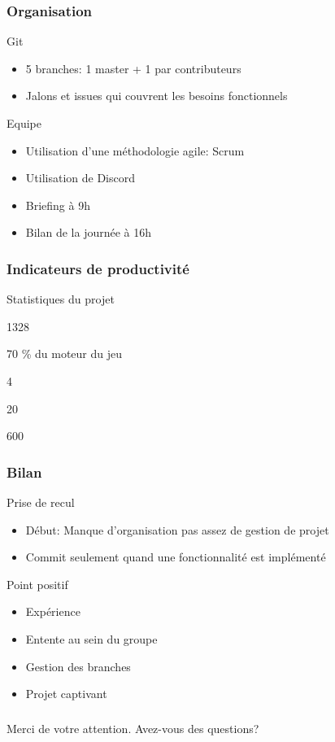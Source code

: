\documentclass[french,t]{beamer}
\begin{document}
	\begin{frame}
		\frametitle{Organisation}
		\begin{block}{Git}
			\begin{itemize}
				\item 5 branches: 1 master + 1 par contributeurs
				\item Jalons et issues qui couvrent les besoins fonctionnels
			\end{itemize}
		\end{block}
	\pause
	\begin{block}{Equipe}
	\begin{itemize}
		\item Utilisation d'une méthodologie agile: Scrum
		\item Utilisation de Discord
		\item Briefing à 9h
		\item Bilan de la journée à 16h
	\end{itemize}
\end{block}
	\end{frame}
	\begin{frame}
		\frametitle{Indicateurs de productivité}
		\begin{block}{Statistiques du projet}
			\begin{description}
				\centering
				\item<1->[Lignes de codes :] 1328
				\item<2->[Tests unitaires (CICD) :] 70 \% du moteur du jeu
				\item<3->[Nombre de jalons :] 4
				\item<4->[Nombre d'issues :] 20
				\item<5->[Commits :] 600
			\end{description}
		\end{block}
	\end{frame}
	\begin{frame}
		\frametitle{Bilan}
		\begin{block}{Prise de recul}
			\begin{itemize}
				\item Début: Manque d'organisation pas assez de gestion de projet
				\item Commit seulement quand une fonctionnalité est implémenté
			\end{itemize}
		\end{block}
		\pause
		\begin{exampleblock}{Point positif}
			\begin{itemize}
				\item Expérience
				\item Entente au sein du groupe
				\item Gestion des branches
				\item Projet captivant
			\end{itemize}
		\end{exampleblock}
	\end{frame}
	\begin{frame}
		\vspace*{\fill}
		\begin{block}{}
		\frametitle{}
			\centering
			Merci de votre attention. Avez-vous des questions?
		\end{block}
		\vspace*{\fill}
	\end{frame}
\end{document}
